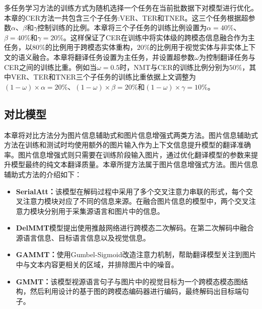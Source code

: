 多任务学习方法的训练方式为随机选择一个任务在当前批数据下对模型进行优化。本章的CER方法一共包含三个子任务:VER、TER和TNER。这三个任务根据超参数$\alpha$、$\beta$和$\gamma$控制训练的比例。本章将三个子任务的训练比例设置为$\alpha=40\%$、$\beta=40\%$和$\gamma=20\%$。这样保证了CER在训练中将实体级的跨模态信息融合作为主任务，以$80\%$的比例用于跨模态实体重构，$20\%$的比例用于视觉实体与非实体上下文的语义融合。本章将翻译任务设置为主任务，并设置超参数$\omega$为控制翻译任务与CER之间的训练比重。例如当$\omega=0.5$时，NMT与CER的训练比例分别为$50\%$，其中VER、TER和TNER三个子任务的训练比重依据上文调整为$(1-\omega)\times\alpha=20\%$、$(1-\omega)\times\beta=20\%$和$(1-\omega)\times\gamma=10\%$。



\subsection{对比模型}
\label{sec:4_comparison}

本章将对比方法分为图片信息辅助式和图片信息增强式两类方法。图片信息辅助式方法在训练和测试时均使用额外的图片输入作为上下文信息提升模型的翻译准确率。图片信息增强式则只需要在训练阶段输入图片，通过优化翻译模型的参数来提升模型最终的纯文本翻译质量。本章所提方法属于图片信息增强式方法。图片信息辅助式方法的介绍如下：

\begin{itemize}

\item \textbf{SerialAtt：}该模型在解码过程中采用了多个交叉注意力串联的形式，每个交叉注意力模块对应了不同的信息来源。在融合图片信息的模型中，两个交叉注意力模块分别用于采集源语言和图片中的信息。

\item \textbf{DelMMT}模型提出使用推敲网络进行跨模态二次解码。在第二次解码中融合源语言信息、目标语言信息以及视觉信息。

\item \textbf{GAMMT：}使用Gumbel-Sigmoid改造注意力机制，帮助翻译模型关注到图片中与文本内容更相关的区域，并排除图片中的噪音。

\item \textbf{GMMT：}该模型视源语言句子与图片中的视觉目标为一个跨模态模态图结构，然后利用设计的基于图的跨模态编码器进行编码，最终解码出目标端句子。
\end{itemize}

